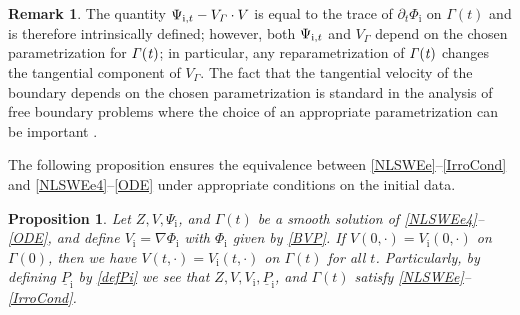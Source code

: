 \documentclass[10pt]{amsart}
\newcommand{\dt}{\partial_t}
\newcommand{\ul}[1]{\underline{#1}}
\newcommand{\itGamma}{\mathit{\Gamma}}
\newtheorem{proposition}[theorem]{Proposition}
\theoremstyle{definition}
\newtheorem{remark}[theorem]{Remark}
\begin{document}
\begin{remark}
The quantity $\Psi_{{\rm i},t} - V_\itGamma\cdot V$ is equal to the trace of $\dt\Phi_\mathrm{i}$ on $\itGamma(t)$ and is therefore intrinsically defined;
however, both $\Psi_{{\rm i},t} $ and $V_\itGamma$ depend on the chosen parametrization for $\it\Gamma(t)$;
in particular, any reparametrization of $\it\Gamma(t)$ changes the tangential component of $V_\itGamma$.
The fact that the tangential velocity of the boundary depends on the chosen parametrization is standard in the analysis of free boundary problems
where the choice of an appropriate parametrization can be important \cite{AmbroseMasmoudi,CordobaGancedo}.
\end{remark}

The following proposition ensures the equivalence between \eqref{NLSWEe}--\eqref{IrroCond} and \eqref{NLSWEe4}--\eqref{ODE} under appropriate conditions
on the initial data.

\begin{proposition}\label{prop:equiv}
Let $Z,V,\Psi_\mathrm{i}$, and $\itGamma(t)$ be a smooth solution of \eqref{NLSWEe4}--\eqref{ODE},
and define $V_\mathrm{i}=\nabla\Phi_\mathrm{i}$ with $\Phi_\mathrm{i}$ given by \eqref{BVP}.
If $V(0,\cdot)=V_\mathrm{i}(0,\cdot)$ on $\itGamma(0)$, then we have $V(t,\cdot)=V_\mathrm{i}(t,\cdot)$ on $\itGamma(t)$ for all $t$.
Particularly, by defining $\ul{P}_\mathrm{i}$ by \eqref{defPi} we see that $Z,V,V_\mathrm{i},\ul{P}_\mathrm{i}$, and $\itGamma(t)$ satisfy \eqref{NLSWEe}--\eqref{IrroCond}.
\end{proposition}
\end{document}
